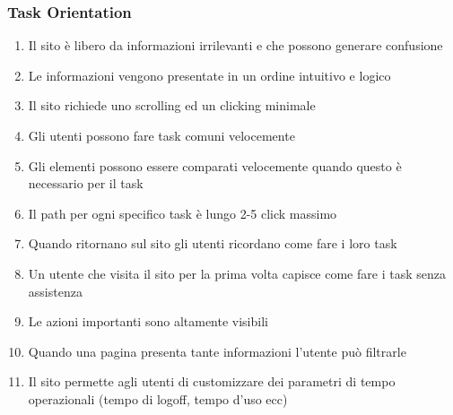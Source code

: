\documentclass[../Report.tex]{subfiles}
\begin{document}
    \subsubsection{Task Orientation}
    \begin{enumerate}
        \item Il sito è libero da informazioni irrilevanti e che possono generare confusione
        \item Le informazioni vengono presentate in un ordine intuitivo e logico
        \item Il sito richiede uno scrolling ed un clicking minimale 
        \item Gli utenti possono fare task comuni velocemente
        \item Gli elementi possono essere comparati velocemente quando questo è necessario per il task 
        \item Il path per ogni specifico task è lungo 2-5 click massimo 
        \item Quando ritornano sul sito gli utenti ricordano come fare i loro task 
        \item Un utente che visita il sito per la prima volta capisce come fare i task senza assistenza
        \item Le azioni importanti sono altamente visibili 
        \item Quando una pagina presenta tante informazioni l’utente può filtrarle  
        \item Il sito permette agli utenti di customizzare dei parametri di tempo operazionali (tempo di logoff, tempo d’uso ecc)
    \end{enumerate}
\end{document}
